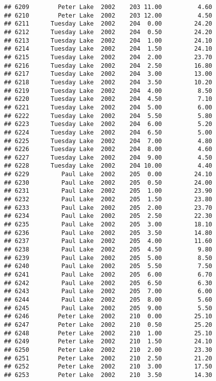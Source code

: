 \documentclass[
]{article}
\begin{document}
\begin{verbatim}
## 6209        Peter Lake  2002    203 11.00          4.60
## 6210        Peter Lake  2002    203 12.00          4.50
## 6211      Tuesday Lake  2002    204  0.00         24.20
## 6212      Tuesday Lake  2002    204  0.50         24.20
## 6213      Tuesday Lake  2002    204  1.00         24.10
## 6214      Tuesday Lake  2002    204  1.50         24.10
## 6215      Tuesday Lake  2002    204  2.00         23.70
## 6216      Tuesday Lake  2002    204  2.50         16.80
## 6217      Tuesday Lake  2002    204  3.00         13.00
## 6218      Tuesday Lake  2002    204  3.50         10.20
## 6219      Tuesday Lake  2002    204  4.00          8.50
## 6220      Tuesday Lake  2002    204  4.50          7.10
## 6221      Tuesday Lake  2002    204  5.00          6.00
## 6222      Tuesday Lake  2002    204  5.50          5.80
## 6223      Tuesday Lake  2002    204  6.00          5.20
## 6224      Tuesday Lake  2002    204  6.50          5.00
## 6225      Tuesday Lake  2002    204  7.00          4.80
## 6226      Tuesday Lake  2002    204  8.00          4.60
## 6227      Tuesday Lake  2002    204  9.00          4.50
## 6228      Tuesday Lake  2002    204 10.00          4.40
## 6229         Paul Lake  2002    205  0.00         24.10
## 6230         Paul Lake  2002    205  0.50         24.00
## 6231         Paul Lake  2002    205  1.00         23.90
## 6232         Paul Lake  2002    205  1.50         23.80
## 6233         Paul Lake  2002    205  2.00         23.70
## 6234         Paul Lake  2002    205  2.50         22.30
## 6235         Paul Lake  2002    205  3.00         18.10
## 6236         Paul Lake  2002    205  3.50         14.80
## 6237         Paul Lake  2002    205  4.00         11.60
## 6238         Paul Lake  2002    205  4.50          9.80
## 6239         Paul Lake  2002    205  5.00          8.50
## 6240         Paul Lake  2002    205  5.50          7.50
## 6241         Paul Lake  2002    205  6.00          6.70
## 6242         Paul Lake  2002    205  6.50          6.30
## 6243         Paul Lake  2002    205  7.00          6.00
## 6244         Paul Lake  2002    205  8.00          5.60
## 6245         Paul Lake  2002    205  9.00          5.50
## 6246        Peter Lake  2002    210  0.00         25.10
## 6247        Peter Lake  2002    210  0.50         25.20
## 6248        Peter Lake  2002    210  1.00         25.10
## 6249        Peter Lake  2002    210  1.50         24.10
## 6250        Peter Lake  2002    210  2.00         23.30
## 6251        Peter Lake  2002    210  2.50         21.20
## 6252        Peter Lake  2002    210  3.00         17.50
## 6253        Peter Lake  2002    210  3.50         14.30

\end{verbatim}
\end{document}
